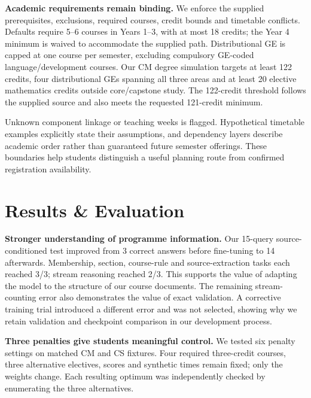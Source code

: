 \documentclass{article}
\begin{document}
\textbf{Academic requirements remain binding.} We enforce the supplied prerequisites, exclusions, required courses, credit bounds and timetable conflicts. Defaults require 5--6 courses in Years 1--3, with at most 18 credits; the Year 4 minimum is waived to accommodate the supplied path. Distributional GE is capped at one course per semester, excluding compulsory GE-coded language/development courses. Our CM degree simulation targets at least 122 credits, four distributional GEs spanning all three areas and at least 20 elective mathematics credits outside core/capstone study. The 122-credit threshold follows the supplied source and also meets the requested 121-credit minimum.

Unknown component linkage or teaching weeks is flagged. Hypothetical timetable examples explicitly state their assumptions, and dependency layers describe academic order rather than guaranteed future semester offerings. These boundaries help students distinguish a useful planning route from confirmed registration availability.

\newpage
\section{Results \& Evaluation}
\textbf{Stronger understanding of programme information.} Our 15-query source-conditioned test improved from 3 correct answers before fine-tuning to 14 afterwards. Membership, section, course-rule and source-extraction tasks each reached 3/3; stream reasoning reached 2/3. This supports the value of adapting the model to the structure of our course documents. The remaining stream-counting error also demonstrates the value of exact validation. A corrective training trial introduced a different error and was not selected, showing why we retain validation and checkpoint comparison in our development process.

\textbf{Three penalties give students meaningful control.} We tested six penalty settings on matched CM and CS fixtures. Four required three-credit courses, three alternative electives, scores and synthetic times remain fixed; only the weights change. Each resulting optimum was independently checked by enumerating the three alternatives.
\end{document}
